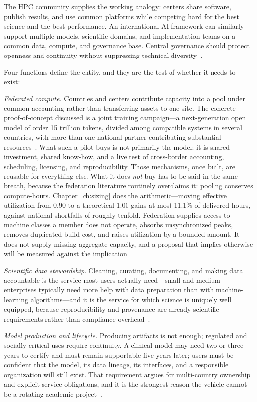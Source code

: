The HPC community supplies the working analogy: centers share software, publish results, and use common platforms while competing hard for the best science and the best performance. An international AI framework can similarly support multiple models, scientific domains, and implementation teams on a common data, compute, and governance base. Central governance should protect openness and continuity without suppressing technical diversity~\cite{consortium-record}.

Four functions define the entity, and they are the test of whether it needs to exist:

\emph{Federated compute.} Countries and centers contribute capacity into a pool under common accounting rather than transferring assets to one site. The concrete proof-of-concept discussed is a joint training campaign---a next-generation open model of order 15 trillion tokens, divided among compatible systems in several countries, with more than one national partner contributing substantial resources~\cite{consortium-record}. What such a pilot buys is not primarily the model: it is shared investment, shared know-how, and a live test of cross-border accounting, scheduling, licensing, and reproducibility. Those mechanisms, once built, are reusable for everything else. What it does \emph{not} buy has to be said in the same breath, because the federation literature routinely overclaims it: pooling conserves compute-hours. Chapter~\ref{ch:sizing} does the arithmetic---moving effective utilization from 0.90 to a theoretical 1.00 gains at most 11.1\% of delivered hours, against national shortfalls of roughly tenfold. Federation supplies access to machine classes a member does not operate, absorbs unsynchronized peaks, removes duplicated build cost, and raises utilization by a bounded amount. It does not supply missing aggregate capacity, and a proposal that implies otherwise will be measured against the implication.

\emph{Scientific data stewardship.} Cleaning, curating, documenting, and making data accountable is the service most users actually need---small and medium enterprises typically need more help with data preparation than with machine-learning algorithms---and it is the service for which science is uniquely well equipped, because reproducibility and provenance are already scientific requirements rather than compliance overhead~\cite{consortium-record}.

\emph{Model production and lifecycle.} Producing artifacts is not enough; regulated and socially critical uses require continuity. A clinical model may need two or three years to certify and must remain supportable five years later; users must be confident that the model, its data lineage, its interfaces, and a responsible organization will still exist. That requirement argues for multi-country ownership and explicit service obligations, and it is the strongest reason the vehicle cannot be a rotating academic project~\cite{consortium-record}.


